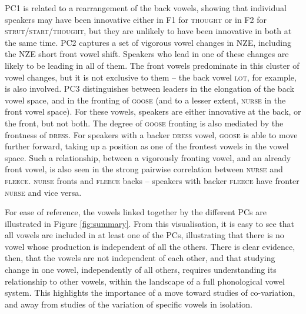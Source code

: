 \documentclass[review]{elsarticle} %
\begin{document}
PC1 is related to a rearrangement of the back vowels, showing that individual speakers may have been innovative either in F1 for \textsc{thought} or in F2 for \textsc{strut/start/thought}, but they are unlikely to have been innovative in both at the same time. PC2 captures a set of vigorous vowel changes in NZE, including the NZE short front vowel shift.  Speakers who lead in one of these changes are likely to be leading in all of them.  The front vowels predominate in this cluster of vowel changes, but it is not exclusive to them -- the back vowel \textsc{lot}, for example, is also involved. PC3 distinguishes between leaders in the elongation of the back vowel space, and in the fronting of \textsc{goose} (and to a lesser extent, \textsc{nurse} in the front vowel space).  For these vowels, speakers are either innovative at the back, or the front, but not both.  The degree of \textsc{goose} fronting is also mediated by the frontness of \textsc{dress}. For speakers with a backer \textsc{dress} vowel, \textsc{goose} is able to move further forward, taking up a position as one of the frontest vowels in the vowel space. Such a relationship, between a vigorously fronting vowel, and an already front vowel, is also seen in the strong pairwise correlation between \textsc{nurse} and \textsc{fleece}.  \textsc{nurse} fronts and \textsc{fleece} backs -- speakers with backer \textsc{fleece} have fronter \textsc{nurse} and vice versa.

For ease of reference, the vowels linked together by the different PCs are illustrated in Figure \ref{fig:summary}. From this visualisation, it is easy to see that all vowels are included in at least one of the PCs, illustrating that there is no vowel whose production is independent of all the others.
There is clear evidence, then, that the vowels are not independent of each other, and that studying change in one vowel, independently of all others, requires understanding its relationship to other vowels, within the landscape of a full phonological vowel system.  This highlights the importance of a move toward studies of co-variation, and away from studies of the variation of specific vowels in isolation.
\end{document}
